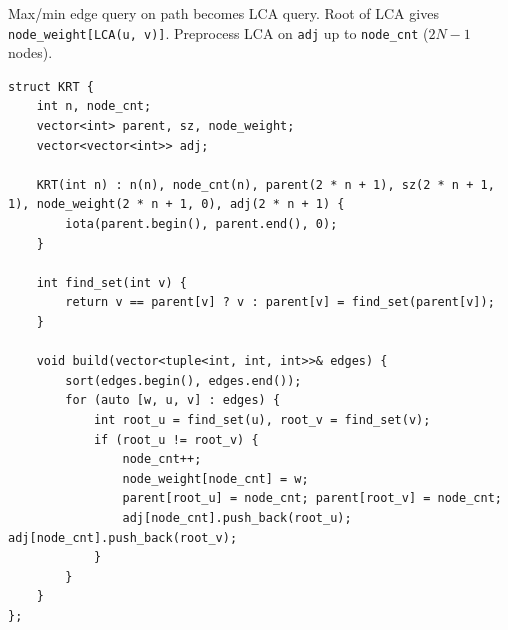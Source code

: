 
Max/min edge query on path becomes LCA query. Root of LCA gives \lstinline|node_weight[LCA(u, v)]|. Preprocess LCA on \lstinline|adj| up to \lstinline|node_cnt| ($2N-1$ nodes).

\begin{lstlisting}
struct KRT {
    int n, node_cnt;
    vector<int> parent, sz, node_weight;
    vector<vector<int>> adj;

    KRT(int n) : n(n), node_cnt(n), parent(2 * n + 1), sz(2 * n + 1, 1), node_weight(2 * n + 1, 0), adj(2 * n + 1) {
        iota(parent.begin(), parent.end(), 0);
    }

    int find_set(int v) {
        return v == parent[v] ? v : parent[v] = find_set(parent[v]);
    }

    void build(vector<tuple<int, int, int>>& edges) {
        sort(edges.begin(), edges.end());
        for (auto [w, u, v] : edges) {
            int root_u = find_set(u), root_v = find_set(v);
            if (root_u != root_v) {
                node_cnt++;
                node_weight[node_cnt] = w;
                parent[root_u] = node_cnt; parent[root_v] = node_cnt;
                adj[node_cnt].push_back(root_u); adj[node_cnt].push_back(root_v);
            }
        }
    }
};
\end{lstlisting}

